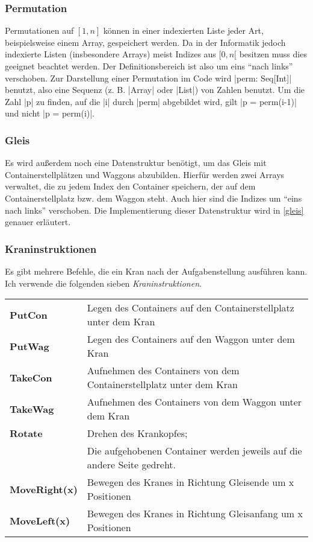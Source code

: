 \subsubsection{Permutation}
Permutationen auf $[1,n]$ können in einer indexierten Liste jeder Art, beispielsweise einem Array, gespeichert werden.
Da in der Informatik jedoch indexierte Listen (insbesondere Arrays) meist Indizes aus $[0,n[$ besitzen muss dies geeignet beachtet werden.
Der Definitionsbereich ist also um eins ``nach links'' verschoben.
Zur Darstellung einer Permutation im Code wird |perm: Seq[Int]| benutzt, also eine Sequenz (z. B. |Array| oder |List|) von Zahlen benutzt.
Um die Zahl |p| zu finden, auf die |i| durch |perm| abgebildet wird, gilt |p = perm(i-1)| und nicht |p = perm(i)|.
\subsubsection{Gleis}
Es wird außerdem noch eine Datenstruktur benötigt, um das Gleis mit Containerstellplätzen und Waggons abzubilden.
Hierfür werden zwei Arrays verwaltet, die zu jedem Index den Container speichern, der auf dem Containerstellplatz bzw. dem Waggon steht.
Auch hier sind die Indizes um ``eins nach links'' verschoben.
Die Implementierung dieser Datenstruktur wird in \ref{gleis} genauer erläutert.
\subsubsection{Kraninstruktionen}
Es gibt mehrere Befehle, die ein Kran nach der Aufgabenstellung ausführen kann.
Ich verwende die folgenden sieben \emph{Kraninstruktionen}.

\begin{center}
\begin{tabular}{ll}
 \textbf{PutCon} & Legen des Containers auf den Containerstellplatz unter dem Kran \\
 \textbf{PutWag} & Legen des Containers auf den Waggon unter dem Kran \\
 \textbf{TakeCon} & Aufnehmen des Containers von dem Containerstellplatz unter dem Kran \\
 \textbf{TakeWag} & Aufnehmen des Containers von dem Waggon unter dem Kran \\
 \textbf{Rotate} & Drehen des Krankopfes; \\
                 & Die aufgehobenen Container werden jeweils auf die andere Seite gedreht. \\
 \textbf{MoveRight(x)} & Bewegen des Kranes in Richtung Gleisende um x Positionen \\
 \textbf{MoveLeft(x)}  & Bewegen des Kranes in Richtung Gleisanfang um x Positionen \\
\end{tabular}
\end{center}

